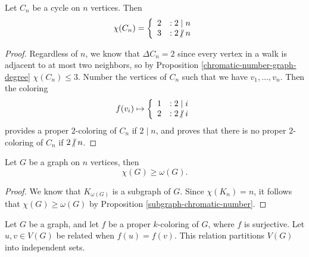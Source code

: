 \begin{prop}\label{cycle-chromatic-parity}
    Let $C_n$ be a cycle on $n$ vertices. Then
    \[\chi(C_n) = \left\{
        \begin{array}{lr}
            2 & : 2 \mid n \\
            3 & : 2 \centernot\mid n
        \end{array}\right.\]
\end{prop}

\begin{proof}
    Regardless of $n$, we know that $\Delta C_n = 2$ since every vertex in a walk is adjacent to at most two neighbors, so by Proposition \ref{chromatic-number-graph-degree} $\chi(C_n) \leq 3$. Number the vertices of $C_n$ such that we have $v_1, \ldots, v_n$. Then the coloring
    \[f(v_i) \mapsto \left\{
        \begin{array}{lr}
            1 & : 2 \mid i \\
            2 & : 2 \centernot\mid i
        \end{array}\right.\] provides a proper $2$-coloring of $C_n$ if $2 \mid n$, and proves that there is no proper $2$-coloring of $C_n$ if $2 \centernot\mid n$.
\end{proof}

\begin{prop}\label{chromatic-cliques-independent-sets}
    Let $G$ be a graph on $n$ vertices, then
    \[\chi(G) \geq \omega(G).\]
\end{prop}

\begin{proof}
    We know that $K_{\omega(G)}$ is a subgraph of $G$. Since $\chi(K_n) = n$, it follows that $\chi(G) \geq \omega(G)$ by Proposition \ref{subgraph-chromatic-number}.
\end{proof}

\begin{lemma}\label{coloring-implies-partition}
    Let $G$ be a graph, and let $f$ be a proper $k$-coloring of $G$, where $f$ is surjective. Let $u, v \in V(G)$ be related when $f(u) = f(v)$. This relation partitions $V(G)$ into independent sets.
\end{lemma}

